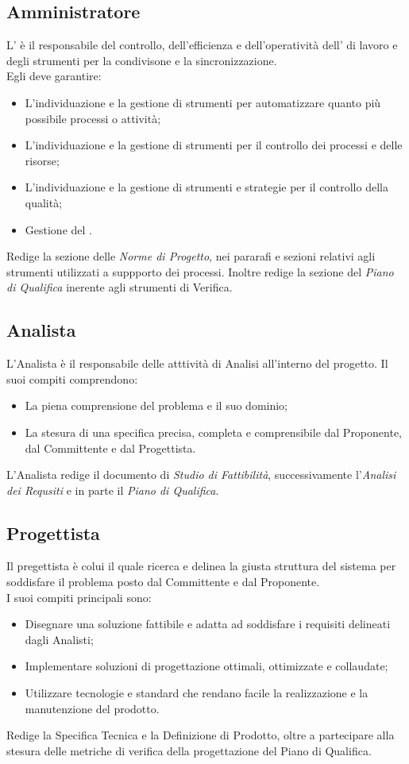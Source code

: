 \subsection{Amministratore}
\label{2.2}
L' è il responsabile del controllo, dell'efficienza e dell'operatività dell' di lavoro e degli strumenti per la condivisone e la sincronizzazione.\\
Egli deve garantire:
\begin{itemize}
\item L'individuazione e la gestione di strumenti per automatizzare quanto più possibile processi o attività;
\item L'individuazione e la gestione di strumenti per il controllo dei processi e delle risorse;
\item L'individuazione e la gestione di strumenti e strategie per il controllo della qualità;
\item Gestione del .
\end{itemize}
Redige la sezione delle \emph{Norme di Progetto}, nei pararafi e sezioni relativi agli strumenti utilizzati a suppporto dei processi. Inoltre redige la sezione del \emph{Piano di Qualifica} inerente agli strumenti di Verifica.

\subsection{Analista}
\label{2.3}
L'Analista è il responsabile delle atttività di Analisi all'interno del progetto. Il suoi compiti comprendono:
\begin{itemize}
\item La piena comprensione del problema e il suo dominio;
\item La stesura di una specifica precisa, completa e comprensibile dal Proponente, dal Committente e dal Progettista.
\end{itemize}
L'Analista redige il documento di \emph{Studio di Fattibilità}, successivamente l'\emph{Analisi dei Requsiti} e in parte il \emph{Piano di Qualifica}.  

\subsection{Progettista}
\label{2.4}
Il pregettista è colui il quale ricerca e delinea la giusta struttura del sistema per soddisfare il problema posto dal Committente e dal Proponente.\\
I suoi compiti principali sono:
\begin{itemize}
\item Disegnare una soluzione fattibile e adatta ad soddisfare i requisiti delineati dagli Analisti;
\item Implementare soluzioni di progettazione ottimali, ottimizzate e collaudate;
\item Utilizzare tecnologie e standard che rendano facile la realizzazione e la manutenzione del prodotto.
\end{itemize}
Redige la Specifica Tecnica e la Definizione di Prodotto, oltre a partecipare alla stesura delle metriche di verifica della progettazione del Piano di Qualifica.

